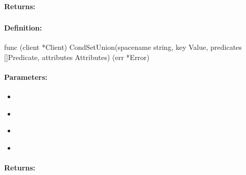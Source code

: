 \paragraph{Returns:}


\pagebreak
\subsubsection{}
\label{api:Go:CondSetUnion}


\paragraph{Definition:}
\begin{gocode}
func (client *Client) CondSetUnion(spacename string, key Value, predicates []Predicate, attributes Attributes) (err *Error)
\end{gocode}

\paragraph{Parameters:}
\begin{itemize}[noitemsep]
\item {}\\

\item {}\\

\item {}\\

\item {}\\

\end{itemize}

\paragraph{Returns:}


\pagebreak
\subsubsection{}
\label{api:Go:GroupSetUnion}


